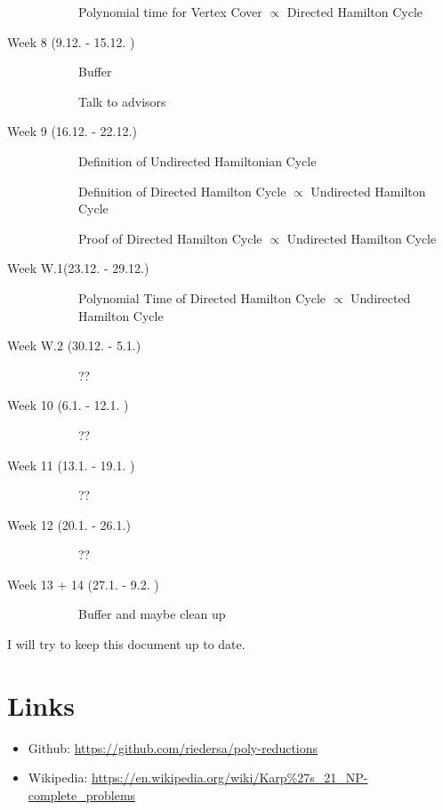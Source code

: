 \documentclass[11pt,a4paper]{scrartcl}
\begin{document}
\begin{description}
		\begin{description}
			\item[\Square] Polynomial time for Vertex Cover $\varpropto$ Directed Hamilton Cycle
		\end{description}
		\item[Week 8 (9.12. - 15.12. )] \hfill 
		\begin{description}
			\item[\Square] Buffer
			\item[\Square] Talk to advisors
		\end{description}
		\item[Week 9 (16.12. - 22.12.)]\hfill 
		\begin{description}
			\item[\Square] Definition of Undirected Hamiltonian Cycle
			\item[\Square] Definition of Directed Hamilton Cycle $\varpropto$ Undirected Hamilton Cycle
			\item[\Square] Proof of Directed Hamilton Cycle $\varpropto$ Undirected Hamilton Cycle
		\end{description}
		\item[Week W.1(23.12. - 29.12.)] \hfill
		\begin{description}
			\item[\Square] Polynomial Time of Directed Hamilton Cycle $\varpropto$ Undirected Hamilton Cycle
		\end{description}
		\item[Week W.2 (30.12. - 5.1.)] \hfill 
		\begin{description}
			\item[\Square] ??
		\end{description}
		\item[Week 10 (6.1. - 12.1. )]  \hfill 
		\begin{description}
			\item[\Square] ??
		\end{description}
		\item[Week 11 (13.1. - 19.1. )]  \hfill 
		\begin{description}
			\item[\Square] ??
		\end{description}
		\item[Week 12 (20.1. - 26.1.)]  \hfill 
		\begin{description}
			\item[\Square] ??
		\end{description}
		\item[Week 13 + 14 (27.1. - 9.2. )]  \hfill 
		\begin{description}
			\item[\Square] Buffer and maybe clean up
		\end{description}
	\end{description}

	I will try to keep this document up to date. 

	\section{Links}
	\begin{itemize}
		\item Github: \url{https://github.com/riedersa/poly-reductions}
		\item Wikipedia: \url{https://en.wikipedia.org/wiki/Karp\%27s_21_NP-complete_problems} 
	\end{itemize}
	
	
	
\end{document}
